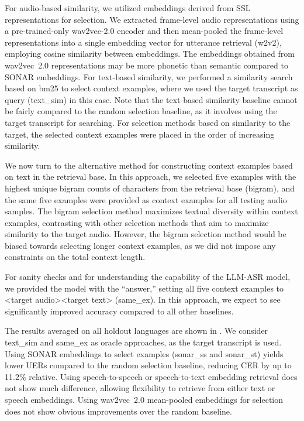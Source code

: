 \documentclass[]{fairmeta}
\begin{document}
For audio-based similarity, we utilized embeddings derived from SSL representations for selection. We extracted frame-level audio representations using a pre-trained-only wav2vec-2.0 encoder and then mean-pooled the frame-level representations into a single embedding vector for utterance retrieval (w2v2), employing cosine similarity between embeddings. The embeddings obtained from wav2vec~2.0 representations may be more phonetic than semantic \citep{choi2024self} compared to SONAR embeddings. For text-based similarity, we performed a similarity search based on bm25 \citep{bm25} to select context examples, where we used the target transcript as query (text\_sim) in this case. Note that the text-based similarity baseline cannot be fairly compared to the random selection baseline, as it involves using the target transcript for searching. For selection methods based on similarity to the target, the selected context examples were placed in the order of increasing similarity.

We now turn to the alternative method for constructing context examples based on text in the retrieval base.
In this approach, we selected five examples with the highest unique bigram counts of characters from the retrieval base (bigram), and the same five examples were provided as context examples for all testing audio samples. The bigram selection method maximizes textual diversity within context examples, contrasting with other selection methods that aim to maximize similarity to the target audio. However, the bigram selection method would be biased towards selecting longer context examples, as we did not impose any constraints on the total context length.

For sanity checks and for understanding the capability of the LLM-ASR model, we provided the model with the ``answer,'' setting all five context examples to <target audio><target text> (same\_ex). In this approach, we expect to see significantly improved accuracy compared to all other baselines.

The results averaged on all holdout languages are shown in . We consider text\_sim and same\_ex as oracle approaches, as the target transcript is used. Using SONAR embeddings to select examples (sonar\_ss and sonar\_st) yields lower UERs compared to the random selection baseline, reducing CER by up to 11.2\% relative. Using speech-to-speech or speech-to-text embedding retrieval does not show much difference, allowing flexibility to retrieve from either text or speech embeddings.
Using wav2vec~2.0 mean-pooled embeddings for selection does not show obvious improvements over the random baseline. 
\end{document}
